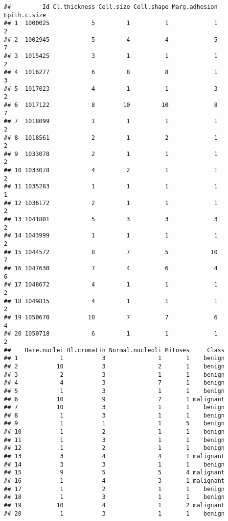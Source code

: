 \documentclass[
]{article}
\begin{document}
\begin{verbatim}
##         Id Cl.thickness Cell.size Cell.shape Marg.adhesion Epith.c.size
## 1  1000025            5         1          1             1            2
## 2  1002945            5         4          4             5            7
## 3  1015425            3         1          1             1            2
## 4  1016277            6         8          8             1            3
## 5  1017023            4         1          1             3            2
## 6  1017122            8        10         10             8            7
## 7  1018099            1         1          1             1            2
## 8  1018561            2         1          2             1            2
## 9  1033078            2         1          1             1            2
## 10 1033078            4         2          1             1            2
## 11 1035283            1         1          1             1            1
## 12 1036172            2         1          1             1            2
## 13 1041801            5         3          3             3            2
## 14 1043999            1         1          1             1            2
## 15 1044572            8         7          5            10            7
## 16 1047630            7         4          6             4            6
## 17 1048672            4         1          1             1            2
## 18 1049815            4         1          1             1            2
## 19 1050670           10         7          7             6            4
## 20 1050718            6         1          1             1            2
##    Bare.nuclei Bl.cromatin Normal.nucleoli Mitoses     Class
## 1            1           3               1       1    benign
## 2           10           3               2       1    benign
## 3            2           3               1       1    benign
## 4            4           3               7       1    benign
## 5            1           3               1       1    benign
## 6           10           9               7       1 malignant
## 7           10           3               1       1    benign
## 8            1           3               1       1    benign
## 9            1           1               1       5    benign
## 10           1           2               1       1    benign
## 11           1           3               1       1    benign
## 12           1           2               1       1    benign
## 13           3           4               4       1 malignant
## 14           3           3               1       1    benign
## 15           9           5               5       4 malignant
## 16           1           4               3       1 malignant
## 17           1           2               1       1    benign
## 18           1           3               1       1    benign
## 19          10           4               1       2 malignant
## 20           1           3               1       1    benign
\end{verbatim}
\end{document}
